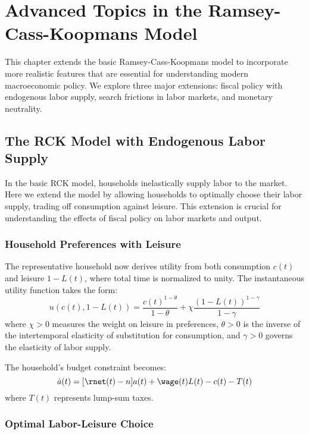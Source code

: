 \documentclass[\topdir/lecture\_notes.tex]{subfiles}
\begin{document}
\chapter{Advanced Topics in the Ramsey-Cass-Koopmans Model}

This chapter extends the basic Ramsey-Cass-Koopmans model to incorporate more realistic features that are essential for understanding modern macroeconomic policy. We explore three major extensions: fiscal policy with endogenous labor supply, search frictions in labor markets, and monetary neutrality.

\section{The RCK Model with Endogenous Labor Supply}

In the basic RCK model, households inelastically supply labor to the market. Here we extend the model by allowing households to optimally choose their labor supply, trading off consumption against leisure. This extension is crucial for understanding the effects of fiscal policy on labor markets and output.

\subsection{Household Preferences with Leisure}

The representative household now derives utility from both consumption $c(t)$ and leisure $1-L(t)$, where total time is normalized to unity. The instantaneous utility function takes the form:
\begin{equation}
u(c(t), 1-L(t)) = \frac{c(t)^{1-\theta}}{1-\theta} + \chi \frac{(1-L(t))^{1-\gamma}}{1-\gamma}
\end{equation}
where $\chi > 0$ measures the weight on leisure in preferences, $\theta > 0$ is the inverse of the intertemporal elasticity of substitution for consumption, and $\gamma > 0$ governs the elasticity of labor supply.

The household's budget constraint becomes:
\begin{equation}
\dot{a}(t) = [\rnet(t)-n]a(t) + \wage(t)L(t) - c(t) - T(t)
\end{equation}
where $T(t)$ represents lump-sum taxes.

\subsection{Optimal Labor-Leisure Choice}
\end{document}
